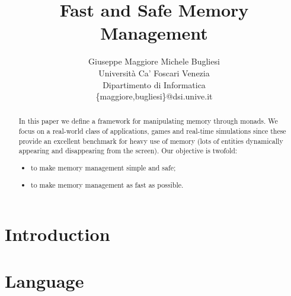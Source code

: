 \documentclass[a4paper]{article}
\begin{document}
\title{\bf Fast and Safe Memory Management}

\author{Giuseppe Maggiore \quad Michele Bugliesi
 \\ Universit\`a Ca' Foscari Venezia
 \\ Dipartimento di Informatica 
 \\ \{maggiore,bugliesi\}@dsi.unive.it
}

\date{}
\maketitle

\begin{abstract}
In this paper we define a framework for manipulating memory through monads. We focus on a real-world class of applications, games and real-time simulations since these provide an excellent benchmark for heavy use of memory (lots of entities dynamically appearing and disappearing from the screen). Our objective is twofold:
\begin{itemize}
\item to make memory management simple and safe;
\item to make memory management as fast as possible.
\end{itemize}
\end{abstract}

\section{Introduction}
\label{sec:intro}
 

\section{Language}
\label{sec:language}
 
\end{document}
